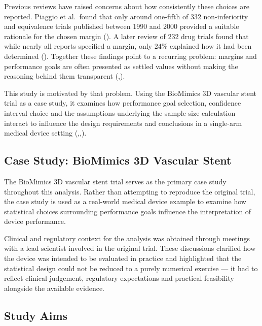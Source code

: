 \documentclass{article}
\begin{document}
Previous reviews have raised concerns about how consistently these
choices are reported. Piaggio et al.~found that only around one-fifth of
332 non-inferiority and equivalence trials published between 1990 and
2000 provided a suitable rationale for the chosen margin
(). A later review of 232 drug
trials found that while nearly all reports specified a margin, only 24\%
explained how it had been determined
(). Together these findings
point to a recurring problem: margins and performance goals are often
presented as settled values without making the reasoning behind them
transparent
(,).

This study is motivated by that problem. Using the BioMimics 3D vascular
stent trial as a case study, it examines how performance goal selection,
confidence interval choice and the assumptions underlying the sample
size calculation interact to influence the design requirements and
conclusions in a single-arm medical device setting
(,,).

\subsection{Case Study: BioMimics 3D Vascular
Stent}\label{case-study-biomimics-3d-vascular-stent}

The BioMimics 3D vascular stent trial serves as the primary case study
throughout this analysis. Rather than attempting to reproduce the
original trial, the case study is used as a real-world medical device
example to examine how statistical choices surrounding performance goals
influence the interpretation of device performance.

Clinical and regulatory context for the analysis was obtained through
meetings with a lead scientist involved in the original trial. These
discussions clarified how the device was intended to be evaluated in
practice and highlighted that the statistical design could not be
reduced to a purely numerical exercise --- it had to reflect clinical
judgement, regulatory expectations and practical feasibility alongside
the available evidence.

\subsection{Study Aims}\label{study-aims}
\end{document}
